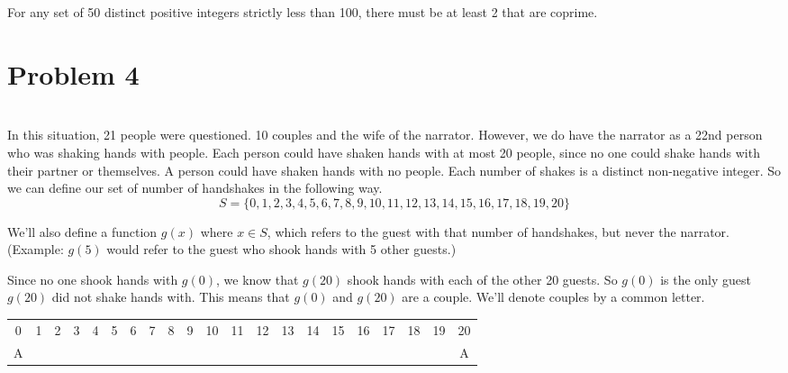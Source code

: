 \documentclass[12pt]{article}
\begin{document}
For any set of 50 distinct positive integers strictly less than 100, there must be at least 2 that are coprime.

\newpage
\section*{Problem 4}
\\

In this situation, 21 people were questioned. 10 couples and the wife of the narrator. However, we do have the narrator as a 22nd person who was shaking hands with people. Each person could have shaken hands with at most 20 people, since no one could shake hands with their partner or themselves. A person could have shaken hands with no people. Each number of shakes is a distinct non-negative integer. So we can define our set of number of handshakes in the following way.
\[S = \{0,1,2,3,4,5,6,7,8,9,10,11,12,13,14,15,16,17,18,19,20\}\]

We'll also define a function $g(x)$ where $x \in S$, which refers to the guest with that number of handshakes, but never the narrator. (Example: $g(5)$ would refer to the guest who shook hands with 5 other guests.)

Since no one shook hands with $g(0)$, we know that $g(20)$ shook hands with each of the other 20 guests. So $g(0)$ is the only guest $g(20)$ did not shake hands with. This means that $g(0)$ and $g(20)$ are a couple. We'll denote couples by a common letter.
\begin{center}
    \begin{tabular}{|c|c|c|c|c|c|c|c|c|c|c|c|c|c|c|c|c|c|c|c|c|}
        \hline
        0 & 1 & 2 & 3 & 4 & 5 & 6 & 7 & 8 & 9 & 10 & 11 & 12 & 13 & 14 & 15 & 16 & 17 & 18 & 19 & 20 \\
        A &  &  &  &  &  &  &  &  &  &  &  &  &  &  &  &  &  &  &  & A \\
        \hline
    \end{tabular}
\end{center}
\end{document}

